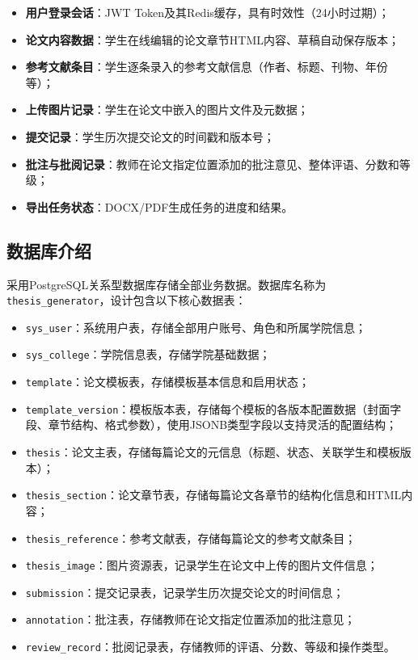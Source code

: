 \documentclass{../softeng}
\begin{document}
\begin{itemize}
    \item \textbf{用户登录会话}：JWT Token及其Redis缓存，具有时效性（24小时过期）；
    \item \textbf{论文内容数据}：学生在线编辑的论文章节HTML内容、草稿自动保存版本；
    \item \textbf{参考文献条目}：学生逐条录入的参考文献信息（作者、标题、刊物、年份等）；
    \item \textbf{上传图片记录}：学生在论文中嵌入的图片文件及元数据；
    \item \textbf{提交记录}：学生历次提交论文的时间戳和版本号；
    \item \textbf{批注与批阅记录}：教师在论文指定位置添加的批注意见、整体评语、分数和等级；
    \item \textbf{导出任务状态}：DOCX/PDF生成任务的进度和结果。
\end{itemize}

\subsection{数据库介绍}

采用PostgreSQL关系型数据库存储全部业务数据。数据库名称为\verb|thesis_generator|，设计包含以下核心数据表：

\begin{itemize}
    \item \verb|sys_user|：系统用户表，存储全部用户账号、角色和所属学院信息；
    \item \verb|sys_college|：学院信息表，存储学院基础数据；
    \item \verb|template|：论文模板表，存储模板基本信息和启用状态；
    \item \verb|template_version|：模板版本表，存储每个模板的各版本配置数据（封面字段、章节结构、格式参数），使用JSONB类型字段以支持灵活的配置结构；
    \item \verb|thesis|：论文主表，存储每篇论文的元信息（标题、状态、关联学生和模板版本）；
    \item \verb|thesis_section|：论文章节表，存储每篇论文各章节的结构化信息和HTML内容；
    \item \verb|thesis_reference|：参考文献表，存储每篇论文的参考文献条目；
    \item \verb|thesis_image|：图片资源表，记录学生在论文中上传的图片文件信息；
    \item \verb|submission|：提交记录表，记录学生历次提交论文的时间信息；
    \item \verb|annotation|：批注表，存储教师在论文指定位置添加的批注意见；
    \item \verb|review_record|：批阅记录表，存储教师的评语、分数、等级和操作类型。
\end{itemize}
\end{document}
